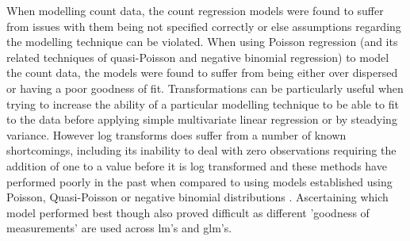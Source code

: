 When modelling count data, the count regression models were found to suffer from issues with them being not specified correctly or else assumptions regarding the modelling technique can be violated.  When using Poisson regression (and its related techniques of quasi-Poisson and negative binomial regression) to model the count data, the models were found to suffer from being either over dispersed or having a poor goodness of fit. Transformations can be particularly useful when trying to increase the ability of a particular modelling technique to be able to fit to the data 
before applying simple multivariate linear regression or by steadying variance. However log transforms does suffer from a number of known shortcomings, including its inability to deal with zero observations requiring the addition of one to a value before it is log transformed and these methods have performed poorly in the past when compared to using models established using Poisson, Quasi-Poisson or negative binomial distributions \citep{o2010not}. Ascertaining which model performed best though  also proved difficult as different 'goodness of measurements' are used across lm's and glm's. 

